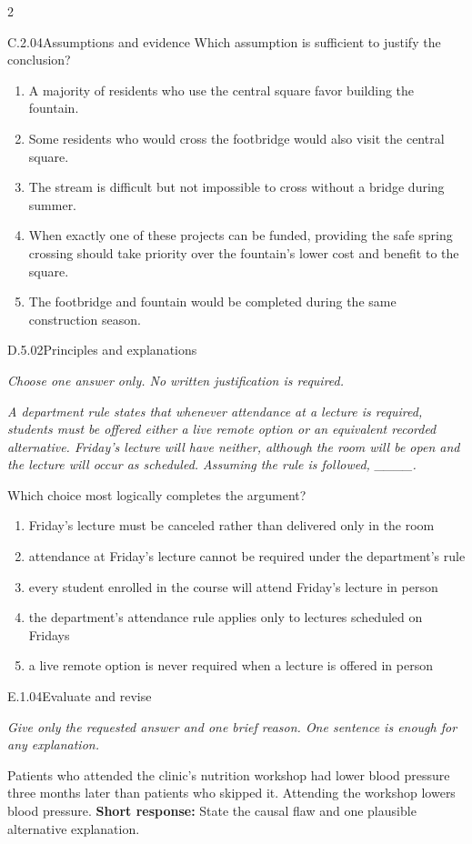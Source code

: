 \documentclass[9pt]{extarticle}
\newcommand{\choice}[1]{\item #1}
\begin{document}
\begin{multicols}{2}
\begin{DenseCoreProblem}{C.2.04}{Assumptions and evidence}
Which assumption is sufficient to justify the conclusion?
\begin{enumerate}[label=(\alph*)]
  \choice{A majority of residents who use the central square favor building the fountain.}
  \choice{Some residents who would cross the footbridge would also visit the central square.}
  \choice{The stream is difficult but not impossible to cross without a bridge during summer.}
  \choice{When exactly one of these projects can be funded, providing the safe spring crossing should take priority over the fountain's lower cost and benefit to the square.}
  \choice{The footbridge and fountain would be completed during the same construction season.}
\end{enumerate}
\end{DenseCoreProblem}
\begin{DenseCoreProblem}{D.5.02}{Principles and explanations}
{\scriptsize\textit{Choose one answer only. No written justification is required.}\par}
\emph{A department rule states that whenever attendance at a lecture is required, students must be offered either a live remote option or an equivalent recorded alternative. Friday's lecture will have neither, although the room will be open and the lecture will occur as scheduled. Assuming the rule is followed, \_\_\_\_.}

Which choice most logically completes the argument?
\begin{enumerate}[label=(\alph*)]
  \choice{Friday's lecture must be canceled rather than delivered only in the room}
  \choice{attendance at Friday's lecture cannot be required under the department's rule}
  \choice{every student enrolled in the course will attend Friday's lecture in person}
  \choice{the department's attendance rule applies only to lectures scheduled on Fridays}
  \choice{a live remote option is never required when a lecture is offered in person}
\end{enumerate}
\end{DenseCoreProblem}
\begin{DenseCoreProblem}{E.1.04}{Evaluate and revise}
{\scriptsize\textit{Give only the requested answer and one brief reason. One sentence is enough for any explanation.}\par}
Patients who attended the clinic's nutrition workshop had lower blood pressure three months later than patients who skipped it. Attending the workshop lowers blood pressure.
\textbf{Short response:} State the causal flaw and one plausible alternative explanation.
\end{DenseCoreProblem}
\end{multicols}
\end{document}
